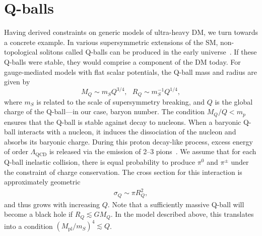 \documentclass[preprintnumbers,amsmath,amssymb,prd,superscriptaddress]{revtex4}
\begin{document}
\section{Q-balls}
\label{sec:qballs}
Having derived constraints on generic models of ultra-heavy DM, we turn towards a concrete example.
In various supersymmetric extensions of the SM, non-topological solitons called Q-balls can be produced in the early universe~\cite{Coleman:1985ki, Kusenko:1997si}.
If these Q-balls were stable, they would comprise a component of the DM today.
For gauge-mediated models with flat scalar potentials, the Q-ball mass and radius are given by
\begin{equation}
\label{eq:Qballprop}
M_Q \sim m_S Q^{3/4}, ~~~ R_Q \sim m_S^{-1} Q^{1/4},
\end{equation}
where $m_S$ is related to the scale of supersymmetry breaking, and $Q$ is the global charge of the Q-ball---in our case, baryon number.
The condition $M_Q/Q < m_p$ ensures that the Q-ball is stable against decay to nucleons.
When a baryonic Q-ball interacts with a nucleon, it induces the dissociation of the nucleon and absorbs its baryonic charge.
During this proton decay-like process, excess energy of order $\Lambda_\text{QCD}$ is released via the emission of 2--3 pions~\cite{Kusenko:1998}.
We assume that for each Q-ball inelastic collision, there is equal probability to produce $\pi^0$ and $\pi^\pm$ under the constraint of charge conservation.
The cross section for this interaction is approximately geometric
\begin{align}
\sigma_Q \sim \pi R_Q^2,
\end{align}
and thus grows with increasing $Q$.
Note that a sufficiently massive Q-ball will become a black hole if $R_Q \lesssim G M_Q$.
In the model described above, this translates into a condition $(M_\text{pl}/m_S)^4 \lesssim Q$.
\end{document}
